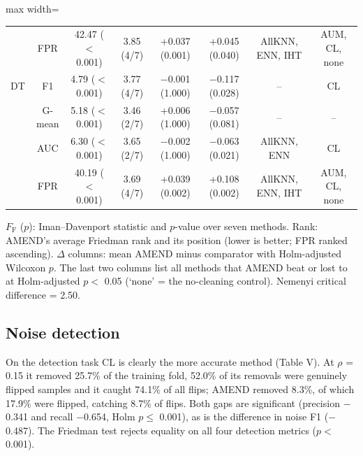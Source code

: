 \documentclass[conference]{IEEEtran}
\begin{document}
\begin{table}[!t]
\begin{adjustbox}{max width=\linewidth}
\begin{tabular}{lccccccc}
& FPR & 42.47 ($<$0.001) & 3.85 (4/7) & +0.037 (0.001) & +0.045 (0.040) & AllKNN, ENN, IHT & AUM, CL, none \\
DT & F1 & 4.79 ($<$0.001) & 3.77 (4/7) & $-$0.001 (1.000) & $-$0.117 (0.028) & -- & CL \\
& G-mean & 5.18 ($<$0.001) & 3.46 (2/7) & +0.006 (1.000) & $-$0.057 (0.081) & -- & -- \\
& AUC & 6.30 ($<$0.001) & 3.65 (2/7) & $-$0.002 (1.000) & $-$0.063 (0.021) & AllKNN, ENN & CL \\
& FPR & 40.19 ($<$0.001) & 3.69 (4/7) & +0.039 (0.002) & +0.108 (0.002) & AllKNN, ENN, IHT & AUM, CL, none \\
\hline
\end{tabular}
\end{adjustbox}
\par\vspace{3pt}
\begin{minipage}{\linewidth}\scriptsize $F_{\mathrm{F}}$ ($p$): Iman--Davenport statistic and $p$-value over seven methods. Rank: AMEND's average Friedman rank and its position (lower is better; FPR ranked ascending). $\Delta $ columns: mean AMEND minus comparator with Holm-adjusted Wilcoxon $p$. The last two columns list all methods that AMEND beat or lost to at Holm-adjusted $p <$ 0.05 (`none' = the no-cleaning control). Nemenyi critical difference = 2.50.\end{minipage}
\end{table}

\subsection{Noise detection}\label{sec:noise-detection}

On the detection task CL is clearly the more accurate method (Table V). At $\rho $ = 0.15 it removed 25.7\% of the training fold, 52.0\% of its removals were genuinely flipped samples and it caught 74.1\% of all flips; AMEND removed 8.3\%, of which 17.9\% were flipped, catching 8.7\% of flips. Both gaps are significant (precision $-$0.341 and recall $-$0.654, Holm $p \le $ 0.001), as is the difference in noise F1 ($-$0.487). The Friedman test rejects equality on all four detection metrics ($p <$ 0.001).
\end{document}
